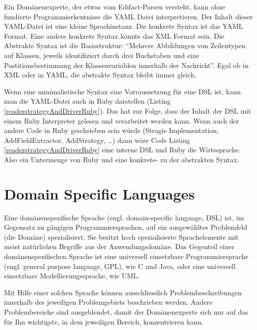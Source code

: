 \documentclass[11pt,english,ngerman, headsepline]{scrreprt}
\begin{document}


Ein Domänenexperte, der etwas vom Edifact-Parsen versteht, kann ohne fundierte
Programmierkentnisse die YAML Datei interpretieren.
Der Inhalt dieser YAML-Datei ist eine kleine Sprachinstanz. Die
konkrete Syntax ist das YAML Format. Eine andere konkrete Syntax könnte
das XML Format sein. Die Abstrakte Syntax ist die Basisstruktur: ``Mehrere
Abbildungen von Zeilentypen auf Klassen, jeweils identifiziert durch drei
Buchstaben und eine Postitionsbestimmung der Klassenvariablen innerhalb der
Nachricht''.
Egal ob in XML oder in YAML, die abstrakte Syntax bleibt immer gleich.

Wenn eine minimalistische Syntax eine Vorraussetzung für eine DSL ist, kann man
die YAML-Datei auch in Ruby darstellen (Listing
\ref{readerstrategyAndDriverRuby}). Das hat zur Folge, dass der Inhalt der DSL
mit einem Ruby Interpreter gelesen und verarbeitet werden kann. Wenn auch der
andere Code in Ruby geschrieben sein würde (Stragie Implementation,
AddFieldExtractor, AddStrategy, \ldots) dann wäre Code Listing
\ref{readerstrategyAndDriverRuby} eine interne DSL und Ruby die Wirtssprache.
Also ein Untermenge von Ruby und eine konkrete- zu der abstrakten Syntax.





\section{Domain Specific Languages}
 

Eine domänenspezifische Sprache (engl. domain-specific language, DSL) ist, im
Gegensatz zu gängigen Programmiersprachen, auf ein ausgewähltes
 Problemfeld (die Domäne) spezialisiert. Sie besitzt hoch spezialisierte
Sprachelemente mit meist natürlichen Begriffe aus der Anwendungsdomäne.
Das Gegenteil einer domänenspezifischen Sprache ist eine universell einsetzbare
Programmiersprache (engl. general purpose language, GPL), wie C und Java, oder
eine universell einsetzbare Modellierungssprache, wie UML.

Mit Hilfe einer solchen Sprache können ausschliesslich Problembeschreibungen
innerhalb des jeweiligen Problemgebiets beschrieben werden.
Andere Problembereiche sind ausgeblendet, damit der Domänenexperte sich
nur auf das für Ihn wichtigste, in dem jeweiligen Bereich, konzentrieren kann.
\end{document}
